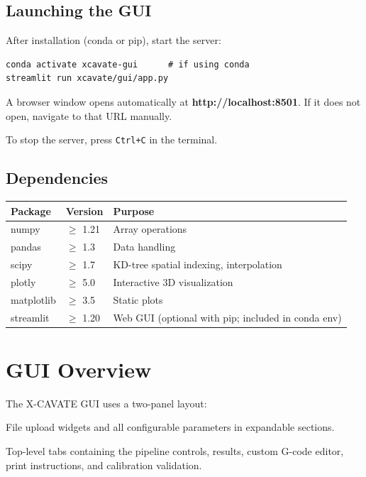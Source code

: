 \documentclass[11pt,letterpaper]{article}
\newcommand{\code}[1]{\texttt{#1}}
\newcommand{\gui}[1]{\textcolor{guicolor}{\textsf{\textbf{#1}}}}
\begin{document}
\subsection{Launching the GUI}

After installation (conda or pip), start the server:

\begin{lstlisting}
conda activate xcavate-gui      # if using conda
streamlit run xcavate/gui/app.py
\end{lstlisting}

A browser window opens automatically at \textbf{http://localhost:8501}. If it
does not open, navigate to that URL manually.

\begin{tipbox}
To stop the server, press \code{Ctrl+C} in the terminal.
\end{tipbox}

\subsection{Dependencies}

\begin{tabularx}{\textwidth}{l l X}
\toprule
\textbf{Package} & \textbf{Version} & \textbf{Purpose} \\
\midrule
numpy       & $\geq$ 1.21 & Array operations \\
pandas      & $\geq$ 1.3  & Data handling \\
scipy       & $\geq$ 1.7  & KD-tree spatial indexing, interpolation \\
plotly      & $\geq$ 5.0  & Interactive 3D visualization \\
matplotlib  & $\geq$ 3.5  & Static plots \\
streamlit   & $\geq$ 1.20 & Web GUI (optional with pip; included in conda env) \\
\bottomrule
\end{tabularx}

\section{GUI Overview}
\label{sec:overview}

The X-CAVATE GUI uses a two-panel layout:

\begin{description}[style=nextline]
    \item[\gui{Sidebar} (left panel)]
    File upload widgets and all configurable parameters in expandable sections.
    \item[\gui{Main area} (right panel)]
    Top-level tabs containing the pipeline controls, results, custom G-code
    editor, print instructions, and calibration validation.
\end{description}
\end{document}
